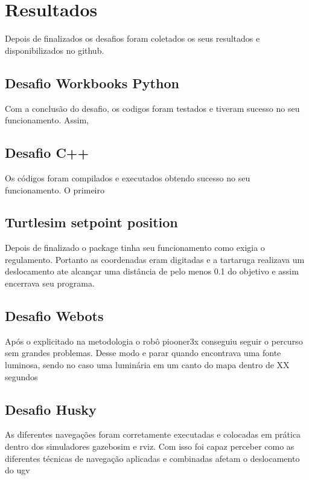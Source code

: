 \chapter{Resultados}
\label{chap:result}
Depois de finalizados os desafios foram coletados os seus resultados e disponibilizados no github.

\section{Desafio Workbooks Python}

Com a conclusão do desafio, os codigos foram testados e tiveram sucesso no seu funcionamento. Assim, 

\section{Desafio C++}

Os códigos foram compilados e executados obtendo sucesso no seu funcionamento. O primeiro

\section{Turtlesim setpoint position}

Depois de finalizado o package tinha seu funcionamento como exigia o regulamento. Portanto as coordenadas eram digitadas e a tartaruga realizava um deslocamento ate alcançar uma distância de pelo menos 0.1 do objetivo e assim encerrava seu programa.

\section{Desafio Webots}

Após o explicitado na metodologia o robô piooner3x conseguiu seguir o percurso sem grandes problemas. Desse modo e parar quando encontrava uma fonte luminosa, sendo no caso uma luminária em um canto do mapa dentro de XX segundos

\section{Desafio Husky}

As diferentes navegações foram corretamente executadas e colocadas em prática dentro dos simuladores gazebosim e rviz. Com isso foi capaz perceber como as diferentes técnicas de navegação aplicadas e combinadas afetam o deslocamento do ugv



